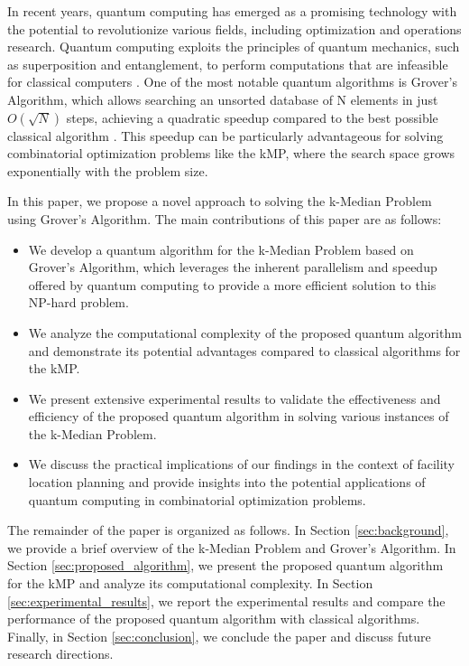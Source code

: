 In recent years, quantum computing has emerged as a promising technology with the potential to revolutionize various fields, including optimization and operations research. Quantum computing exploits the principles of quantum mechanics, such as superposition and entanglement, to perform computations that are infeasible for classical computers \cite{nielsen2010quantum}. One of the most notable quantum algorithms is Grover's Algorithm, which allows searching an unsorted database of N elements in just $O(\sqrt{N})$ steps, achieving a quadratic speedup compared to the best possible classical algorithm \cite{grover1996fast}. This speedup can be particularly advantageous for solving combinatorial optimization problems like the kMP, where the search space grows exponentially with the problem size.

In this paper, we propose a novel approach to solving the k-Median Problem using Grover's Algorithm. The main contributions of this paper are as follows:

\begin{itemize}
    \item We develop a quantum algorithm for the k-Median Problem based on Grover's Algorithm, which leverages the inherent parallelism and speedup offered by quantum computing to provide a more efficient solution to this NP-hard problem.
    
    \item We analyze the computational complexity of the proposed quantum algorithm and demonstrate its potential advantages compared to classical algorithms for the kMP.
    
    \item We present extensive experimental results to validate the effectiveness and efficiency of the proposed quantum algorithm in solving various instances of the k-Median Problem.
    
    \item We discuss the practical implications of our findings in the context of facility location planning and provide insights into the potential applications of quantum computing in combinatorial optimization problems.
\end{itemize}

The remainder of the paper is organized as follows. In Section \ref{sec:background}, we provide a brief overview of the k-Median Problem and Grover's Algorithm. In Section \ref{sec:proposed_algorithm}, we present the proposed quantum algorithm for the kMP and analyze its computational complexity. In Section \ref{sec:experimental_results}, we report the experimental results and compare the performance of the proposed quantum algorithm with classical algorithms. Finally, in Section \ref{sec:conclusion}, we conclude the paper and discuss future research directions.


